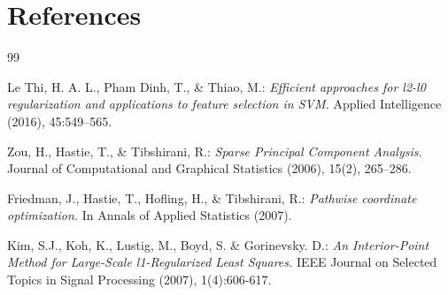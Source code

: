 \documentclass[fleqn]{report} %
\begin{document}
\section*{References}
\begin{thebibliography}{99} %

Le Thi, H. A. L., Pham Dinh, T., \& Thiao, M.: \textit{Efficient approaches for l2-l0 regularization
and applications to feature selection in SVM.} Applied Intelligence (2016), 45:549–565.

Zou, H., Hastie, T., \& Tibshirani, R.: \textit{Sparse Principal Component Analysis.} Journal of Computational and Graphical Statistics (2006), 15(2), 265–286.

Friedman, J., Hastie, T., Hofling, H., \& Tibshirani, R.: \textit{Pathwise coordinate optimization.} In Annals
of Applied Statistics  (2007).

Kim, S.J., Koh, K., Lustig, M., Boyd, S. \& Gorinevsky. D.: \textit{An Interior-Point Method for Large-Scale l1-Regularized Least Squares.} IEEE Journal on Selected Topics in Signal Processing (2007), 1(4):606-617.

\end{thebibliography}
\end{document}
